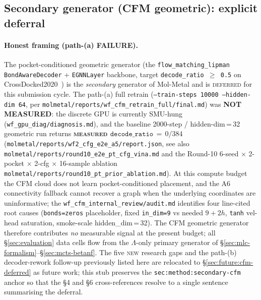 







\subsection{Secondary generator (CFM geometric): explicit deferral}
\label{sec:method:secondary-cfm}

\paragraph{Honest framing (path-(a) FAILURE).}
The pocket-conditioned geometric generator (the
\texttt{flow\_matching\_lipman} \texttt{BondAwareDecoder} +
\texttt{EGNNLayer} backbone, target
\texttt{decode\_ratio\,$\geq$\,0.5} on
CrossDocked2020~\cite{luo2021crossdocked}) is the
\emph{secondary} generator of Mol-Metal and is \textsc{deferred}
for this submission cycle. The path-(a) full retrain
(\texttt{--train-steps\,10000 --hidden-dim\,64}, per
\texttt{molmetal/reports/wf\_cfm\_retrain\_full/final.md}) was
\textbf{NOT MEASURED}: the discrete GPU is currently SMU-hung
(\texttt{wf\_gpu\_diag/diagnosis.md}), and the baseline
2000-step / hidden-dim\,=\,32 geometric run returns
\textbf{\textsc{measured} $\texttt{decode\_ratio}\,=\,0/384$}
(\texttt{molmetal/reports/wf2\_cfg\_e2e\_a5/report.json},
see also
\texttt{molmetal/reports/round10\_e2e\_pt\_cfg\_vina.md} and
the Round-10 6-seed $\times$ 2-pocket $\times$ 2-cfg $\times$
16-sample ablation
\texttt{molmetal/reports/round10\_pt\_prior\_ablation.md}).
At this compute budget the CFM cloud does not learn
pocket-conditioned placement, and the A6 connectivity fallback
cannot recover a graph when the underlying coordinates are
uninformative; the
\texttt{wf\_cfm\_internal\_review/audit.md}
identifies four line-cited root causes
(\texttt{bonds=zeros} placeholder, fixed \texttt{in\_dim=9}
vs needed $9+2h$, \texttt{tanh} vel-head saturation,
smoke-scale hidden\_dim\,=\,32). The CFM
geometric generator therefore contributes \emph{no} measurable
signal at the present budget; all \S\ref{sec:evaluation}
data cells flow from the $\Lambda$-only primary generator of
\S\ref{sec:mlc-formalism}--\S\ref{sec:mcts-betanf}.
The five \textsc{new} research gaps and the path-(b)
decoder-rework follow-up previously listed here are
relocated to \S\ref{sec:future:cfm-deferred} as future
work; this stub preserves the
\texttt{sec:method:secondary-cfm} anchor so that the
\S4 and \S6 cross-references resolve to a single sentence
summarising the deferral.


